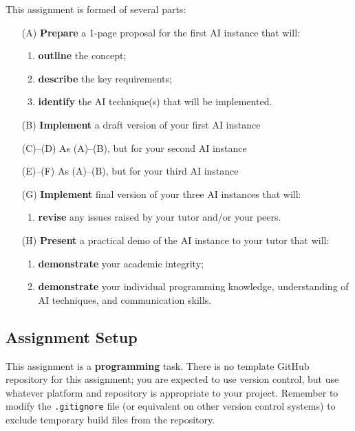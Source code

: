 \documentclass{../../fal_assignment}
\begin{document}
This assignment is formed of several parts:
\begin{enumerate}
	\item[(A)] \textbf{Prepare} a 1-page proposal for the first AI instance that will:
		\begin{enumerate}[label=(\roman*)]
			\item \textbf{outline} the concept;
			\item \textbf{describe} the key requirements;
			\item \textbf{identify} the AI technique(s) that will be implemented.
		\end{enumerate}
	\item[(B)] \textbf{Implement} a draft version of your first AI instance
	\item[(C)--(D)] As (A)--(B), but for your second AI instance
	\item[(E)--(F)] As (A)--(B), but for your third AI instance
	\item[(G)] \textbf{Implement} final version of your three AI instances that will:
		\begin{enumerate}[label=(\roman*)]
			\item \textbf{revise} any issues raised by your tutor and/or your peers.
		\end{enumerate}
	\item[(H)] \textbf{Present} a practical demo of the AI instance to your tutor that will:
		\begin{enumerate}[label=(\roman*)]
			\item \textbf{demonstrate} your academic integrity;
			\item \textbf{demonstrate} your individual programming knowledge, understanding of AI techniques, and communication skills.
		\end{enumerate}
\end{enumerate}


\subsection*{Assignment Setup} 

This assignment is a \textbf{programming} task.
There is no template GitHub repository for this assignment;
you are expected to use version control, but use whatever platform and repository
is appropriate to your project.
Remember to modify the \texttt{.gitignore} file (or equivalent on other version control systems) to exclude temporary build files
from the repository.
\end{document}

